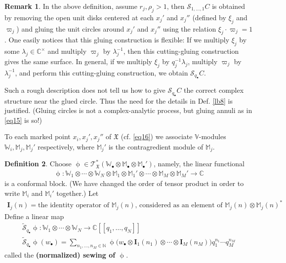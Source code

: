 \documentclass[11pt,b5paper,notitlepage]{article}
\theoremstyle{definition}
\newtheorem{df}{Definition}[section]
\newtheorem{rem}[df]{Remark}
\theoremstyle{plain}
\newcommand{\fk}{\mathfrak}
\newcommand{\mc}{\mathcal}
\newcommand{\scr}{\mathscr}
\newcommand{\blt}{\bullet}
\newcommand{\Vbb}{\mathbb V}
\newcommand{\Wbb}{\mathbb W}
\newcommand{\Mbb}{\mathbb M}
\newcommand{\Cbb}{\mathbb C}
\newcommand{\Nbb}{\mathbb N}
\newcommand{\Ibf}{\mathbf I}
\newcommand{\Std}{\widetilde{\mc S}}
\numberwithin{equation}{section}
\begin{document}
\begin{rem}
In the above definition, assume $r_j,\rho_j>1$, then $\mc S_{1,\dots,1} C$ is obtained by removing the open unit disks centered at each $x_j'$ and $x_j''$ (defined by $\xi_j$ and $\varpi_j$) and gluing the unit circles around $x_j'$ and $x_j''$ using the relation $\xi_j\cdot \varpi_j=1$. One easily notices that this gluing construction is flexible: If we multiply $\xi_j$ by some $\lambda_j\in\Cbb^\times$ and multiply $\varpi_j$ by $\lambda_j^{-1}$, then this cutting-gluing construction gives the same surface. In general, if we multiply $\xi_j$ by $q_j^{-1}\lambda_j$, multiply $\varpi_j$ by $\lambda_j^{-1}$, and perform this cutting-gluing construction, we obtain $\mc S_{q_\blt} C$. 

Such a rough description does not tell us how to give $\mc S_{q_\blt}C$ the correct complex structure near the glued circle. Thus the need for the details in Def. \ref{lb8} is justified. (Gluing circles is not a complex-analytic process, but gluing annuli as in \eqref{eq15} is so!)  \hfill\qedsymbol
\end{rem}

To each marked point $x_i,x_j',x_j''$ of $\fk X$ (cf. \eqref{eq16}) we associate $\Vbb$-modules $\Wbb_i,\Mbb_j,\Mbb_j'$ respectively, where $\Mbb_j'$ is the contragredient module of $\Mbb_j$.  
\begin{df}
Choose $\upphi\in\scr T_{\fk X}^*(\Wbb_\blt\otimes\Mbb_\blt\otimes\Mbb_\blt')$, namely, the linear functional 
\begin{align*}
\upphi:\Wbb_1\otimes\cdots\otimes\Wbb_N\otimes\Mbb_1\otimes\Mbb_1'\otimes\cdots\otimes\Mbb_M\otimes\Mbb_M'\rightarrow\Cbb
\end{align*}
is a conformal block. (We have changed the order of tensor product in order to write $\Mbb_i$ and $\Mbb_i'$ together.) Let
\begin{align*}
\Ibf_j(n)=\text{the identity operator of $\Mbb_j(n)$, considered as an element of $\Mbb_j(n)\otimes \Mbb_j(n)^*$}
\end{align*}
Define a linear map \index{Sq@$\Std_{q_\blt}\upphi$}
\begin{gather*}
\Std_{q_\blt}\upphi:\Wbb_1\otimes\cdots\otimes\Wbb_N\rightarrow \Cbb[[q_1,\dots,q_N]]\\
\Std_{q_\blt}\upphi(w_\blt)=\sum_{n_1,\dots,n_M\in\Nbb}\upphi\big(w_\blt\otimes\Ibf_1(n_1)\otimes\cdots\otimes\Ibf_M(n_M)\big)q_1^{n_1}\cdots q_M^{n_M}
\end{gather*}
called the \textbf{(normalized) sewing of $\upphi$}.
\end{df}
\end{document}
